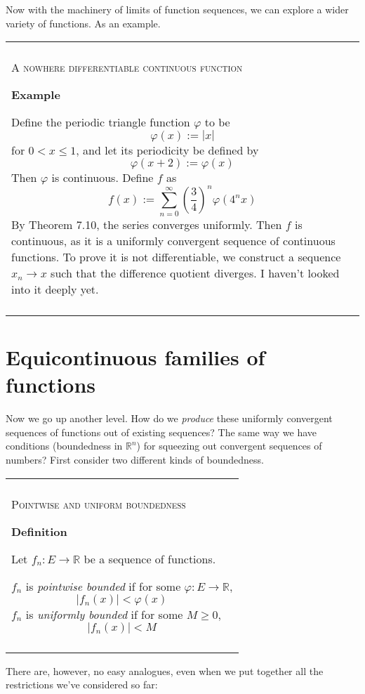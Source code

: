 \documentclass{article}
\newenvironment{myboxed}{\bigskip\noindent\begin{tabular}{|p{.975\linewidth}|}\hline \\}{\\\\\hline\end{tabular}\bigskip}
\begin{document}
Now with the machinery of limits of function sequences, we can explore a wider variety of functions. As an example.

\begin{myboxed}
    \textsc{A nowhere differentiable continuous function}

    \textbf{Example}

    Define the periodic triangle function $\varphi$ to be
    \[\varphi(x) := |x|\]
    for $0 < x \leq 1$, and let its periodicity be defined by
    \[\varphi(x+2) := \varphi(x)\] 
    Then $\varphi$ is continuous. Define $f$ as
    \[f(x) := \sum_{n=0}^\infty \left(\frac{3}{4}\right)^n \varphi(4^nx)\]
    By Theorem 7.10, the series converges uniformly. Then $f$ is continuous, as it is a uniformly convergent sequence of continuous functions.
     To prove it is not differentiable, we construct a sequence $x_n \rightarrow x$ such that the difference quotient diverges. I haven't looked into it deeply yet.
 \end{myboxed}


\newpage 
\section{Equicontinuous families of functions}

Now we go up another level. How do we \textit{produce} these uniformly convergent sequences of functions out of existing sequences? The same way we have conditions (boundedness in $\mathbb{R}^n$) for squeezing out convergent sequences of numbers? First consider two different kinds of boundedness.

\begin{myboxed}
    \textsc{Pointwise and uniform boundedness}
    
    \textbf{Definition}
    
    Let $f_n: E \rightarrow \mathbb{R}$ be a sequence of functions.

    $f_n$ is \textit{pointwise bounded} if for some $\varphi: E \rightarrow \mathbb{R}$,
    \[|f_n(x)| < \varphi(x)\]
    $f_n$ is \textit{uniformly bounded} if for some $M \geq 0$,
    \[|f_n(x)| < M\]
\end{myboxed}

There are, however, no easy analogues, even when we put together all the restrictions we've considered so far:
\end{document}
